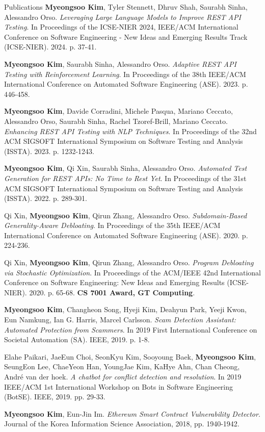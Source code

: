 \documentclass{resume} %
\begin{document}
\begin{rSection}{Publications}
\textbf{Myeongsoo Kim}, Tyler Stennett, Dhruv Shah, Saurabh Sinha, Alessandro Orso. \textit{Leveraging Large Language Models to Improve REST API Testing}. In Proceedings of the ICSE-NIER 2024, IEEE/ACM International Conference on Software Engineering - New Ideas and Emerging Results Track (ICSE-NIER). 2024. p. 37-41.

\textbf{Myeongsoo Kim}, Saurabh Sinha, Alessandro Orso. \textit{Adaptive REST API Testing with Reinforcement Learning}. In Proceedings of the 38th IEEE/ACM International Conference on Automated Software Engineering (ASE). 2023. p. 446-458.

\textbf{Myeongsoo Kim}, Davide Corradini, Michele Pasqua, Mariano Ceccato, Alessandro Orso, Saurabh Sinha, Rachel Tzoref-Brill, Mariano Ceccato. \textit{Enhancing REST API Testing with NLP Techniques}. In Proceedings of the 32nd ACM SIGSOFT International Symposium on Software Testing and Analysis (ISSTA). 2023. p. 1232-1243.

\textbf{Myeongsoo Kim}, Qi Xin, Saurabh Sinha, Alessandro Orso. \textit{Automated Test Generation for REST APIs: No Time to Rest Yet}. In Proceedings of the 31st ACM SIGSOFT International Symposium on Software Testing and Analysis (ISSTA). 2022. p. 289-301.

Qi Xin, \textbf{Myeongsoo Kim}, Qirun Zhang, Alessandro Orso. \textit{Subdomain-Based Generality-Aware Debloating}. In Proceedings of the 35th IEEE/ACM International Conference on Automated Software Engineering (ASE). 2020. p. 224-236.

Qi Xin, \textbf{Myeongsoo Kim}, Qirun Zhang, Alessandro Orso. \textit{Program Debloating via Stochastic Optimization}. In Proceedings of the ACM/IEEE 42nd International Conference on Software Engineering: New Ideas and Emerging Results (ICSE-NIER). 2020. p. 65-68. \textbf{CS 7001 Award, GT Computing}.

\textbf{Myeongsoo Kim}, Changheon Song, Hyeji Kim, Deahyun Park, Yeeji Kwon, Eun Namkung, Ian G. Harris, Marcel Carlsson. \textit{Scam Detection Assistant: Automated Protection from Scammers}. In 2019 First International Conference on Societal Automation (SA). IEEE, 2019. p. 1-8.

Elahe Paikari, JaeEun Choi, SeonKyu Kim, Sooyoung Baek, \textbf{Myeongsoo Kim}, SeungEon Lee, ChaeYeon Han, YoungJae Kim, KaHye Ahn, Chan Cheong, André van der hoek. \textit{A chatbot for conflict detection and resolution}. In 2019 IEEE/ACM 1st International Workshop on Bots in Software Engineering (BotSE). IEEE, 2019. pp. 29-33.

\textbf{Myeongsoo Kim}, Eun-Jin Im. \textit{Ethereum Smart Contract Vulnerability Detector}. Journal of the Korea Information Science Association, 2018, pp. 1940-1942.

\end{rSection}
\end{document}
